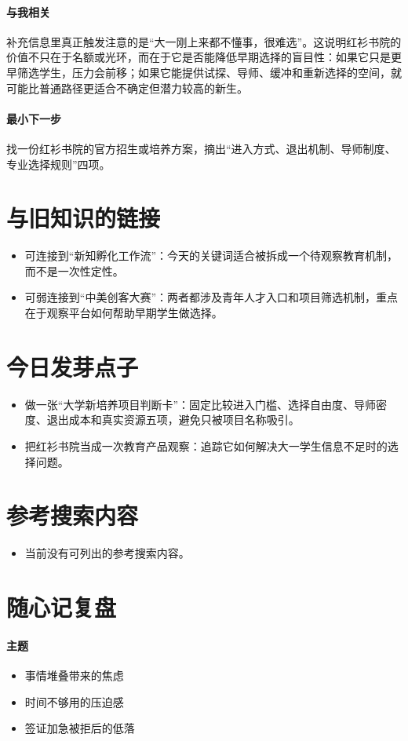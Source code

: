 \documentclass[UTF8,zihao=-4]{ctexart}
\begin{document}
\paragraph{与我相关} 补充信息里真正触发注意的是“大一刚上来都不懂事，很难选”。这说明红衫书院的价值不只在于名额或光环，而在于它是否能降低早期选择的盲目性：如果它只是更早筛选学生，压力会前移；如果它能提供试探、导师、缓冲和重新选择的空间，就可能比普通路径更适合不确定但潜力较高的新生。
\paragraph{最小下一步} 找一份红衫书院的官方招生或培养方案，摘出“进入方式、退出机制、导师制度、专业选择规则”四项。
\section*{与旧知识的链接}
\begin{itemize}[leftmargin=2em]
\item 可连接到“新知孵化工作流”：今天的关键词适合被拆成一个待观察教育机制，而不是一次性定性。
\item 可弱连接到“中美创客大赛”：两者都涉及青年人才入口和项目筛选机制，重点在于观察平台如何帮助早期学生做选择。
\end{itemize}
\section*{今日发芽点子}
\begin{itemize}[leftmargin=2em]
\item 做一张“大学新培养项目判断卡”：固定比较进入门槛、选择自由度、导师密度、退出成本和真实资源五项，避免只被项目名称吸引。
\item 把红衫书院当成一次教育产品观察：追踪它如何解决大一学生信息不足时的选择问题。
\end{itemize}
\section*{参考搜索内容}
\begin{itemize}[leftmargin=2em]
\item 当前没有可列出的参考搜索内容。
\end{itemize}
\section*{随心记复盘}
\paragraph{主题}
\begin{itemize}[leftmargin=2em]
\item 事情堆叠带来的焦虑
\item 时间不够用的压迫感
\item 签证加急被拒后的低落
\end{itemize}
\end{document}
